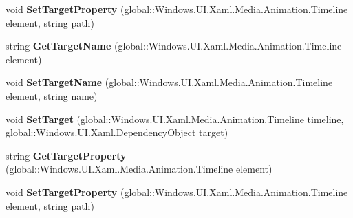 \begin{DoxyCompactItemize}
\item 
\mbox{\label{interface_windows_1_1_u_i_1_1_xaml_1_1_media_1_1_animation_1_1_i_storyboard_statics_ae3787739563318b3f3282dfec151be5c}} 
void {\bfseries Set\+Target\+Property} (global\+::\+Windows.\+U\+I.\+Xaml.\+Media.\+Animation.\+Timeline element, string path)
\item 
\mbox{\label{interface_windows_1_1_u_i_1_1_xaml_1_1_media_1_1_animation_1_1_i_storyboard_statics_afeb68a7d3fc61bb8fdbba68aab2f0d4f}} 
string {\bfseries Get\+Target\+Name} (global\+::\+Windows.\+U\+I.\+Xaml.\+Media.\+Animation.\+Timeline element)
\item 
\mbox{\label{interface_windows_1_1_u_i_1_1_xaml_1_1_media_1_1_animation_1_1_i_storyboard_statics_ad1745f5d472fa822ee6f34d92a55ae55}} 
void {\bfseries Set\+Target\+Name} (global\+::\+Windows.\+U\+I.\+Xaml.\+Media.\+Animation.\+Timeline element, string name)
\item 
\mbox{\label{interface_windows_1_1_u_i_1_1_xaml_1_1_media_1_1_animation_1_1_i_storyboard_statics_ab3c5f3b6891c82842a641da8d1254fdc}} 
void {\bfseries Set\+Target} (global\+::\+Windows.\+U\+I.\+Xaml.\+Media.\+Animation.\+Timeline timeline, global\+::\+Windows.\+U\+I.\+Xaml.\+Dependency\+Object target)
\item 
\mbox{\label{interface_windows_1_1_u_i_1_1_xaml_1_1_media_1_1_animation_1_1_i_storyboard_statics_a62e7f08dda4730dc9bec8462837a7476}} 
string {\bfseries Get\+Target\+Property} (global\+::\+Windows.\+U\+I.\+Xaml.\+Media.\+Animation.\+Timeline element)
\item 
\mbox{\label{interface_windows_1_1_u_i_1_1_xaml_1_1_media_1_1_animation_1_1_i_storyboard_statics_ae3787739563318b3f3282dfec151be5c}} 
void {\bfseries Set\+Target\+Property} (global\+::\+Windows.\+U\+I.\+Xaml.\+Media.\+Animation.\+Timeline element, string path)

\end{DoxyCompactItemize}
